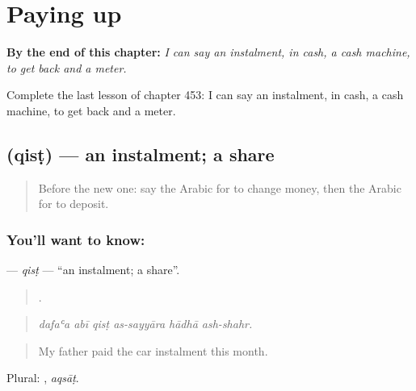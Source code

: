 
\chapter{Paying up}
\label{ch:ar-paying-up}

\begin{chapteropening}
\textbf{By the end of this chapter:} \emph{I can say an instalment, in cash, a cash machine, to get back and a meter.}

Complete the last lesson of chapter 453: I can say an instalment, in cash, a cash machine, to get back and a meter.
\end{chapteropening}

\section[\texorpdfstring{\ar{قسط} (qisṭ)}{قسط (qisṭ)}]{ (qisṭ) — an instalment; a share}

\label{lesson:AR-C453-qist}



\begin{quote}
Before the new one: say the Arabic for to change money, then the Arabic for to deposit.
\end{quote}

\subsection*{You'll want to know: }
\textbf{} — \emph{qisṭ} — \textquotedblleft{}an instalment; a share\textquotedblright{}.

\begin{quote}
     .
\end{quote}

\begin{quote}
\emph{dafaʿa abī qisṭ as-sayyāra hādhā ash-shahr.}
\end{quote}

\begin{quote}
My father paid the car instalment this month.
\end{quote}

Plural: , \emph{aqsāṭ}.

